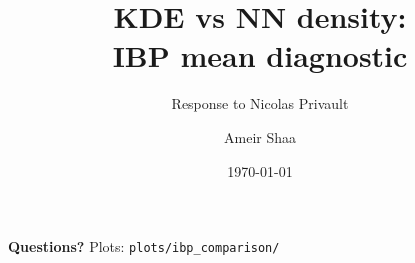 \documentclass[aspectratio=169,11pt]{beamer}
\title{KDE vs NN density:\\IBP mean diagnostic}
\subtitle{Response to Nicolas Privault}
\author{Ameir Shaa}
\date{\today}
\institute{LocalVolatility PINN pipeline}
\begin{document}
\maketitle



\begin{frame}{}
    \begin{center}
        \vspace{2cm}
        {\Huge\bfseries\color{white} Questions?}
        \vspace{0.5cm}
        {\large\color{ntugold}Plots: \texttt{plots/ibp\_comparison/}}
    \end{center}
\end{frame}
\end{document}

